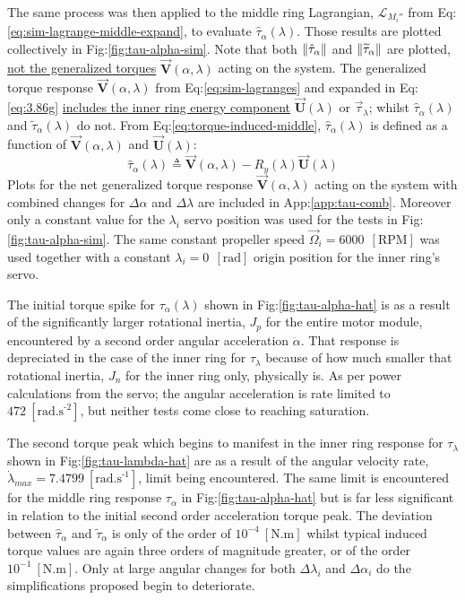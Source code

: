 The same process was then applied to the middle ring Lagrangian, $\mathcal{L}_{M_i''}$ from Eq:\ref{eq:sim-lagrange-middle-expand}, to evaluate $\hat{\tau}_\alpha(\lambda)$. Those results are plotted collectively in Fig:\ref{fig:tau-alpha-sim}. Note that both $\left\lVert\hat{\tau}_\alpha\right\rVert$ and $\left\lVert\widetilde{\tau}_\alpha\right\rVert$ are plotted, \underline{not the generalized torques} $\vec{\mathbf{V}}(\alpha,\lambda)$ acting on the system. The generalized torque response $\vec{\mathbf{V}}(\alpha,\lambda)$ from Eq:\ref{eq:sim-lagranges} and expanded in Eq:\ref{eq:3.86g} \underline{includes the inner ring energy component} $\vec{\mathbf{U}}(\lambda)$ or $\vec{\tau}_\lambda$; whilst $\hat{\tau}_\alpha(\lambda)$ and $\tilde{\tau}_\alpha(\lambda)$ do not. From Eq:\ref{eq:torque-induced-middle}, $\hat{\tau}_\alpha(\lambda)$ is defined as a function of $\vec{\mathbf{V}}(\alpha,\lambda)$ and $\vec{\mathbf{U}}(\lambda)$:
\begin{equation}
\hat{\tau}_\alpha(\lambda)\triangleq \vec{\mathbf{V}}(\alpha,\lambda)-R_y(\lambda)\vec{\mathbf{U}}(\lambda)
\end{equation}
Plots for the net generalized torque response $\vec{\mathbf{V}}(\alpha,\lambda)$ acting on the system with combined changes for $\Delta\alpha$ and $\Delta\lambda$ are included in App:\ref{app:tau-comb}. Moreover only a constant value for the $\lambda_i$ servo position was used for the tests in Fig:\ref{fig:tau-alpha-sim}. The same constant propeller speed $\vec{\Omega}_i=6000~~[\text{RPM}]$ was used together with a constant $\lambda_i=0~~[\text{rad}]$ origin position for the inner ring's servo.
\par
The initial torque spike for $\tau_\alpha(\lambda)$ shown in Fig:\ref{fig:tau-alpha-hat} is as a result of the significantly larger rotational inertia, $J_{p}$ for the entire motor module, encountered by a second order angular acceleration $\ddot{\alpha}$. That response is depreciated in the case of the inner ring for $\tau_\lambda$ because of how much smaller that rotational inertia, $J_n$ for the inner ring only, physically is. As per power calculations from the servo; the angular acceleration is rate limited to $472~[\text{rad.s}^{\text{-}2}]$, but neither tests come close to reaching saturation.
\par
The second torque peak which begins to manifest in the inner ring response for $\tau_\lambda$ shown in Fig:\ref{fig:tau-lambda-hat} are as a result of the angular velocity rate, $\dot{\lambda}_{max}=7.4799~[\text{rad.s}^{\text{-}1}]$, limit being encountered. The same limit is encountered for the middle ring response $\tau_\alpha$ in Fig:\ref{fig:tau-alpha-hat} but is far less significant in relation to the initial second order acceleration torque peak. The deviation between $\hat{\tau}_\alpha$ and $\tilde{\tau}_\alpha$ is only of the order of $10^{-4}~[\text{N.m}]$ whilst typical induced torque values are again three orders of magnitude greater, or of the order $10^{-1}~[\text{N.m}]$. Only at large angular changes for both $\Delta\lambda_i$ and $\Delta\alpha_i$ do the simplifications proposed begin to deteriorate.
